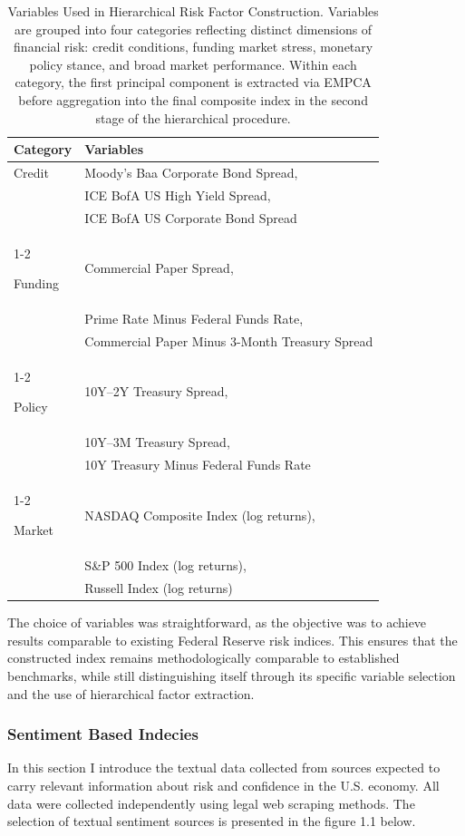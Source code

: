 \documentclass[12pt,a4paper]{report}\usepackage[a4paper, top=2.5cm, bottom=2.5cm, left=2.5cm, right=2.5cm]{geometry}
\begin{document}
\begin{table}[H]
\centering
\vspace{0.3cm}
\renewcommand{\arraystretch}{1.4}
\begin{tabular}{p{3cm} p{10cm}}
\hline
\textbf{Category} & \textbf{Variables} \\
\hline

Credit 
& Moody's Baa Corporate Bond Spread, \\
& ICE BofA US High Yield Spread, \\
& ICE BofA US Corporate Bond Spread \\
\cline{1-2}

Funding 
& Commercial Paper Spread, \\
& Prime Rate Minus Federal Funds Rate, \\
& Commercial Paper Minus 3-Month Treasury Spread \\
\cline{1-2}

Policy 
& 10Y--2Y Treasury Spread, \\
& 10Y--3M Treasury Spread, \\
& 10Y Treasury Minus Federal Funds Rate \\
\cline{1-2}

Market 
& NASDAQ Composite Index (log returns), \\
& S\&P 500 Index (log returns), \\
& Russell Index (log returns) \\
\hline

\end{tabular}
\caption{Variables Used in Hierarchical Risk Factor Construction. Variables are grouped into four categories reflecting distinct dimensions of financial risk: credit conditions, funding market stress, monetary policy stance, and broad market performance. Within each category, the first principal component is extracted via EMPCA before aggregation into the final composite index in the second stage of the hierarchical procedure.}
\label{tab:hierarchical_risk_variables}
\end{table}

The choice of variables was straightforward, as the objective was to achieve results comparable to existing Federal Reserve risk indices. This ensures that the constructed index remains methodologically comparable to established benchmarks, while still distinguishing itself through its specific variable selection and the use of hierarchical factor extraction.

\subsubsection{Sentiment Based Indecies}
In this section I introduce the textual data collected from sources expected to carry relevant information about risk and confidence in the U.S. economy. All data were collected independently using legal web scraping methods. The selection of textual sentiment sources is presented in the figure 1.1 below.
\end{document}
